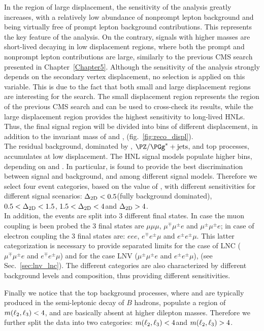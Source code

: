In the region of large displacement, the sensitivity of the analysis
greatly increases, with a relatively low abundance of nonprompt lepton
background and being virtually free of prompt lepton background
contributions. This represents the key feature of the analysis.
On the contrary, signals with higher masses are short-lived \hnl
decaying in low displacement regions, where both the prompt and
nonprompt lepton contributions are large, similarly to the previous
CMS search presented in Chapter~\ref{Chapter5}.
Although the sensitivity of the analysis strongly depends on the
secondary vertex displacement, no selection is applied on this
variable. This is due to the fact that both small and large
displacement regions are interesting for the search. The small
displacement region represents the region of the previous CMS search
and can be used to cross-check its results, while the large
displacement region provides the highest sensitivity to long-lived
HNLs. 
Thus, the final signal region will be divided into bins of different
displacement, in addition to the invariant mass of \ltwo and \lthree,
\mtwol (fig.~\ref{fig:reco_displ}).\\

The residual background, dominated by \Xg,
$\PZ/\PGg^{\ast}+\mathrm{jets}$, and top processes, accumulates at low
displacement. The HNL signal models populate higher \Deltwod bins, depending on \mhnl and \mixpar. In particular, \Deltwod
is found to provide the best discrimination between signal and
background, and among different signal models.
Therefore we select four event categories, based on the value of
\Deltwod, with different sensitivities for different signal
scenarios:
$\Delta_{\mathrm{2D}}<0.5$\cm (fully background dominated), $0.5<\Delta_{\mathrm{2D}}<1.5$\cm,
$1.5<\Delta_{\mathrm{2D}}<4$\cm and $\Delta_{\mathrm{2D}}>4$\cm.\\
In addition, the events are split into 3 different final states. In case 
the muon coupling is been probed the 3 final states are $\mu\mu\mu$,  $\mu^{\mp}\mu^{\pm} e$ 
and $\mu^{\pm}\mu^{\pm}e$; in case of electron coupling the 3 final states
are: $eee$,  $e^{\mp}e^{\pm}\mu$ and $e^{\pm}e^{\pm}\mu$. This latter categorization
is necessary to provide separated limits for the case of LNC ($\mu^{\mp}\mu^{\pm} e$ and $e^{\mp}e^{\pm}\mu$)
and for the case LNV ($\mu^{\pm}\mu^{\pm} e$ and $e^{\pm}e^{\pm}\mu$), (see Sec.~\ref{sec:lnv_lnc}).
The different categories are also characterized by different
background levels and composition, thus providing different
sensitivities.

Finally we notice that the top background processes, where \ltwo and
\lthree are typically produced in the semi-leptonic decay of $B$
hadrons, populate a region of $m(\ell_2,\ell_3)<4$\GeV, and are basically absent
at higher dilepton masses. Therefore we further split the data into
two categories: $m(\ell_2,\ell_3)<4$\GeV and $m(\ell_2,\ell_3)>4$\GeV. 

